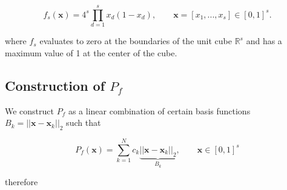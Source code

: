 \documentclass[11pt]{article}
\begin{document}
\begin{equation}
 f_{s}(\mathbf{x}) = 4^s \prod_{d=1}^s x_{d}(1-x_{d}), \qquad \mathbf{x}=[x_1,...,x_s] \in [0,1]^s.
\end{equation}

where $f_{s}$ evaluates to zero at the boundaries of the unit cube
$\mathbb{R}^{s}$ and has a maximum value of 1 at the center of the
cube.

\subsection*{Construction of $P_{f}$}
\label{sec-2-1}
We construct $P_{f}$ as a linear combination of certain basis
functions $B_{k} = ||\mathbf{x} - \mathbf{x}_{k}||_{2}$ such that

\begin{equation}
 P_{f}(\mathbf{x}) = \sum_{k=1}^N c_{k} \underbrace{||\mathbf{x} - \mathbf{x}_{k}||_{2}}_{B_{k}}, \qquad \mathbf{x} \in [0,1]^s
\end{equation}

therefore



\end{document}
